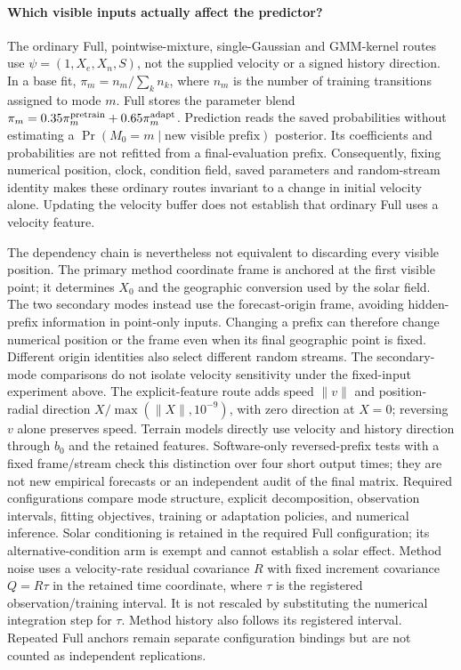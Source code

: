 \paragraph{Which visible inputs actually affect the predictor?}
The ordinary Full, pointwise-mixture, single-Gaussian and GMM-kernel routes
use \(\psi=(1,X_e,X_n,S)\), not the supplied velocity or a signed history
direction. In a base fit, \(\pi_m=n_m/\sum_k n_k\), where \(n_m\) is the
number of training transitions assigned to mode \(m\).
Full stores the parameter blend
\(\pi_m=0.35\pi_m^{\rm pretrain}+0.65\pi_m^{\rm adapt}\).
Prediction reads the saved probabilities without estimating a
\(\Pr(M_0=m\mid\text{new visible prefix})\) posterior. Its coefficients and
probabilities are not refitted from a final-evaluation prefix.
Consequently, fixing numerical position, clock, condition field, saved
parameters and random-stream identity makes these ordinary routes invariant
to a change in initial velocity alone. Updating the velocity buffer does
not establish that ordinary Full uses a velocity feature.

The dependency chain is nevertheless not equivalent to discarding every
visible position. The primary method coordinate frame is anchored at the
first visible point; it determines \(X_0\) and the geographic conversion
used by the solar field. The two secondary modes instead use the
forecast-origin frame, avoiding hidden-prefix information in point-only
inputs. Changing a prefix can therefore change numerical position or the
frame even when its final geographic point is fixed. Different origin
identities also select different random streams. The secondary-mode
comparisons do not isolate velocity sensitivity under the fixed-input
experiment above. The explicit-feature route adds speed
\(\|v\|\) and position-radial direction
\(X/\max(\|X\|,10^{-9})\), with zero direction at \(X=0\);
reversing \(v\) alone preserves speed. Terrain models directly use
velocity and history direction through \(b_0\) and the retained features.
Software-only reversed-prefix tests with a fixed frame/stream check this
distinction over four short output times; they are not new empirical
forecasts or an independent audit of the final matrix.
Required configurations compare mode structure, explicit decomposition, observation
intervals, fitting objectives, training or adaptation policies, and numerical
inference. Solar conditioning is retained in the required Full configuration;
its alternative-condition arm is exempt and cannot establish a solar effect.
Method noise uses a velocity-rate residual
covariance \(R\) with fixed increment covariance \(Q=R\tau\) in the retained time coordinate, where
\(\tau\) is the registered observation/training interval. It is not rescaled
by substituting the numerical integration step for \(\tau\). Method history
also follows its registered interval. Repeated Full anchors remain separate
configuration bindings but are not counted as independent replications.

